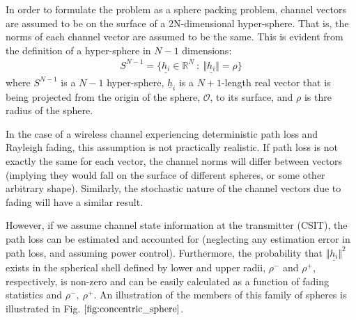In order to formulate the problem as a sphere packing problem, channel vectors are assumed to be on the surface of a 2N-dimensional hyper-sphere. That is, the norms of each channel vector are assumed to be the same. This is evident from the definition of a hyper-sphere in $N-1$ dimensions:
\begin{equation}\label{eq:sphere_def}
    \begin{aligned}
        S^{N-1} = \lbrace \underline{h_i} \in \mathbb{R}^N \ : \ \Vert \underline{h_i} \Vert = \rho \rbrace
    \end{aligned}
\end{equation}
where $S^{N-1}$ is a $N-1$ hyper-sphere, $\underline{h}_i$ is a $N+1$-length real vector that is being projected from the origin of the sphere, $\mathcal{O}$, to its surface, and $\rho$ is thre radius of the sphere.

In the case of a wireless channel experiencing deterministic path loss and Rayleigh fading, this assumption is not practically realistic. If path loss is not exactly the same for each vector, the channel norms will differ between vectors (implying they would fall on the surface of different spheres, or some other arbitrary shape). Similarly, the stochastic nature of the channel vectors due to fading will have a similar result.

However, if we assume channel state information at the transmitter (CSIT), the path loss can be estimated and accounted for (neglecting any estimation error in path loss, and assuming power control). Furthermore, the probability that $\Vert \underline{h_i} \Vert^2$ exists in the spherical shell defined by lower and upper radii, $\rho^-$ and $\rho^+$, respectively, is non-zero and can be easily calculated as a function of fading statistics and $\rho^-,\ \rho^+ $. An illustration of the members of this family of spheres is illustrated in Fig. $\ref{fig:concentric_sphere}$.

